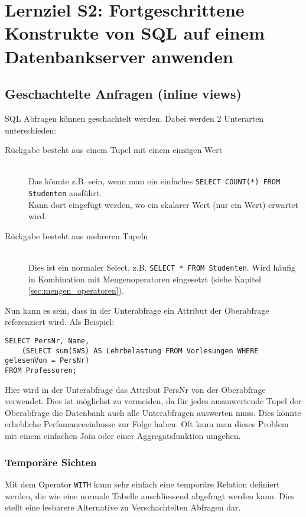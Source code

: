 \section{Lernziel S2: Fortgeschrittene Konstrukte von SQL auf einem Datenbankserver anwenden}

\subsection{Geschachtelte Anfragen (inline views)}

SQL Abfragen können geschachtelt werden. Dabei werden 2 Unterarten unterschieden:
\begin{description}
  \item[Rückgabe besteht aus einem Tupel mit einem einzigen Wert] \hfill \\
  Das könnte z.B. sein, wenn man ein einfaches \texttt{SELECT COUNT(*) FROM Studenten} ausführt. \\
  Kann dort eingefügt werden, wo ein skalarer Wert (nur ein Wert) erwartet wird.
  \item[Rückgabe besteht aus mehreren Tupeln] \hfill \\
  Dies ist ein normaler Select, z.B. \texttt{SELECT * FROM Studenten}. Wird häufig in Kombination mit Mengenoperatoren eingesetzt (siehe Kapitel \ref{sec:mengen_operatoren}).
\end{description}
Nun kann es sein, dass in der Unterabfrage ein Attribut der Oberabfrage referenziert wird. Als Beispiel:

\begin{lstlisting}[caption={Korrelierte Unterabfrage},label=lst:unterabfrage_korreliert]
SELECT PersNr, Name,
	(SELECT sum(SWS) AS Lehrbelastung FROM Vorlesungen WHERE gelesenVon = PersNr)
FROM Professoren;
\end{lstlisting}

Hier wird in der Unterabfrage das Attribut PersNr von der Oberabfrage verwendet. Dies ist möglichst zu vermeiden, da für jedes auszuwertende Tupel der Oberabfrage die Datenbank auch alle Unterabfragen auswerten muss. Dies könnte erhebliche Perfomanceeinbusse zur Folge haben. Oft kann man dieses Problem mit einem einfachen Join oder einer Aggregatsfunktion umgehen.

\subsubsection{Temporäre Sichten}
Mit dem Operator \texttt{WITH} kann sehr einfach eine temporäre Relation definiert werden, die wie eine normale Tabelle anschliessend abgefragt werden kann. Dies stellt eine lesbarere Alternative zu Verschachtelten Abfragen dar.

